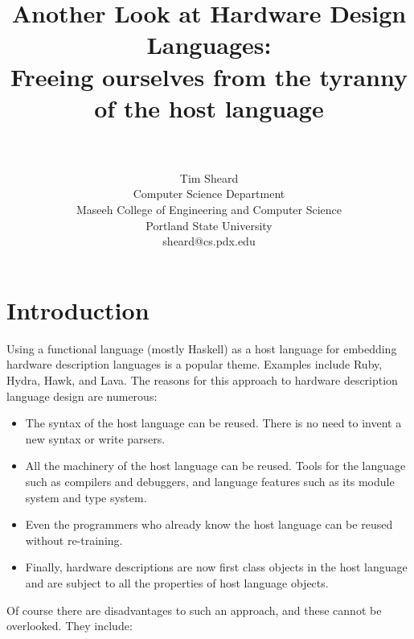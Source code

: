 \documentclass[10pt,twoside]{article}
\begin{document}
\title{Another Look at Hardware Design Languages:\\
\large{Freeing ourselves from the tyranny of the host language}\\
\ \\
}
\author{
Tim Sheard\\
Computer Science Department\\
Maseeh College of Engineering and Computer Science\\
Portland State University\\
sheard@cs.pdx.edu
}

\maketitle

\section{Introduction}\label{intro}

Using a functional language (mostly Haskell) as a host language for embedding
hardware description languages is a popular theme. Examples include Ruby,
Hydra, Hawk, and Lava. The reasons\cite{koen2001} for this approach to hardware description
language design are numerous:

\begin{itemize}

\item The syntax of the host language can be reused. There is no need to
invent a new syntax or write parsers.

\item All the machinery of the host language can be reused. Tools for the
language such as compilers and debuggers, and language features such as its
module system and type system.

\item Even the programmers who already know the host language can be reused
without re-training.

\item Finally, hardware descriptions are now first class objects in the
host language and are subject to all the properties of host language objects.
\end{itemize}

Of course there are disadvantages to such an approach, and these cannot be
overlooked. They include:
\end{document}
